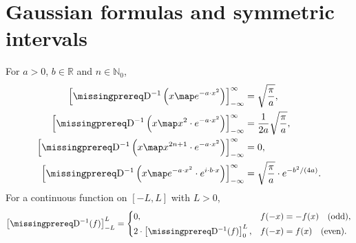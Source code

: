 \documentclass[10pt]{article}
\begin{document}
\section*{Gaussian formulas and symmetric intervals}
For $a>0$, $b\in\mathbb R$ and $n\in\mathbb N_0$,
\begin{align*}
  \left[\DiffOp^{-1}\left(x\map e^{-a\cdot x^2}\right)\right]_{-\infty}^{\infty}
    &=\sqrt{\frac\pi a},\\
  \left[\DiffOp^{-1}\left(x\map x^2\cdot e^{-a\cdot x^2}\right)\right]_{-\infty}^{\infty}
    &=\frac1{2a}\sqrt{\frac\pi a},\\
  \left[\DiffOp^{-1}\left(x\map x^{2n+1}\cdot e^{-a\cdot x^2}\right)\right]_{-\infty}^{\infty}
    &=0,\\
  \left[\DiffOp^{-1}\left(x\map e^{-a\cdot x^2}\cdot e^{i\cdot b\cdot x}\right)\right]_{-\infty}^{\infty}
    &=\sqrt{\frac\pi a}\cdot e^{-b^2/(4a)}.
\end{align*}
For a continuous function on $[-L,L]$ with $L>0$,
\[
  \left[\DiffOp^{-1}(f)\right]_{-L}^{L}
  =\begin{cases}
    0, & f(-x)=-f(x)\quad\text{(odd)},\\[2pt]
    2\cdot\left[\DiffOp^{-1}(f)\right]_0^L,
       & f(-x)=f(x)\quad\text{(even)}.
  \end{cases}
\]
\end{document}
